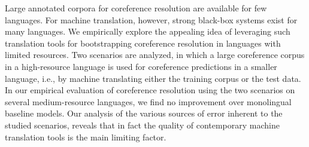 Large annotated corpora for coreference resolution are available for few languages. For machine translation, however, strong black-box systems exist for many languages. We empirically explore the appealing idea of leveraging such translation tools for bootstrapping coreference resolution in languages with limited resources. Two scenarios are analyzed, in which a large coreference corpus in a high-resource language is used for coreference predictions in a smaller language, i.e., by machine translating either the training corpus or the test data. In our empirical evaluation of coreference resolution using the two scenarios on several medium-resource languages, we find no improvement over monolingual baseline models. Our analysis of the various sources of error inherent to the studied scenarios, reveals that in fact the quality of contemporary machine translation tools is the main limiting factor.

